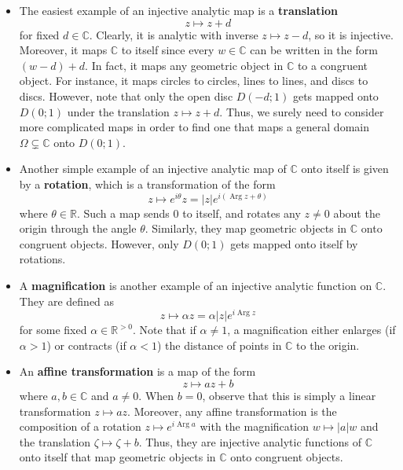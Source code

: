 \documentclass[10pt]{article}
\newcommand{\R}{\mathbb{R}}
\newcommand{\C}{\mathbb{C}}
\DeclareMathOperator{\Arg}{Arg}
\theoremstyle{newstyle}
\begin{document}
\begin{itemize} 

\item The easiest example of an injective analytic map is a {\bf translation} 
\[ z \mapsto z + d \]
for fixed $d \in \C$. Clearly, it is analytic with inverse $z \mapsto z - d$, so it is 
injective. Moreover, it maps $\C$ to itself since every $w \in \C$ can be 
written in the form $(w - d) + d$. In fact, it maps any geometric object in $\C$ to 
a congruent object. For instance, it maps circles to circles, lines to lines, and discs to discs. 
However, note that only the open disc $D(-d; 1)$ gets mapped onto $D(0; 1)$ under the translation 
$z \mapsto z+d$. Thus, we surely need to consider more complicated maps in order to find one 
that maps a general domain $\Omega \subsetneq \C$ onto $D(0; 1)$. 

\item Another simple example of an injective analytic map of $\C$ onto itself is given by a {\bf rotation},
which is a transformation of the form 
\[ z \mapsto e^{i\theta}z = |z|e^{i(\Arg z + \theta)} \]
where $\theta \in \R$. Such a map sends $0$ to itself, and rotates any $z \neq 0$ about the origin 
through the angle $\theta$. Similarly, they map geometric objects in $\C$ onto congruent objects. 
However, only $D(0; 1)$ gets mapped onto itself by rotations. 

\item A {\bf magnification} is another example of an injective analytic function on $\C$. They are 
defined as 
\[ z \mapsto \alpha z = \alpha |z| e^{i\Arg z} \]
for some fixed $\alpha \in \R^{>0}$. Note that if $\alpha \neq 1$, a magnification either 
enlarges (if $\alpha > 1$) or contracts (if $\alpha < 1$) the distance of points in $\C$ 
to the origin. 

\item An {\bf affine transformation} is a map of the form 
\[ z \mapsto az + b \]
where $a, b \in \C$ and $a \neq 0$. When $b = 0$, observe that this is simply a linear transformation 
$z \mapsto az$. Moreover, any affine transformation is the composition of a rotation 
$z \mapsto e^{i\Arg a}$ with the magnification $w \mapsto |a|w$ and the translation 
$\zeta \mapsto \zeta + b$. Thus, they are injective analytic functions of $\C$ onto itself 
that map geometric objects in $\C$ onto congruent objects. 


\end{itemize}
\end{document}
